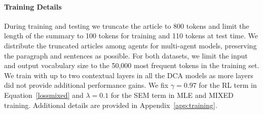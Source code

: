 \documentclass[11pt,a4paper]{article}
\begin{document}
\paragraph{Training Details}
During training and testing we truncate the
article to 800 tokens and limit the length of the
summary to 100 tokens for training and 110 tokens
at test time. We distribute the truncated articles among agents for multi-agent models, preserving the paragraph and sentences as possible. 
For both datasets, we limit the input and output vocabulary size to the 50,000 most frequent tokens in the training set. 
We train with up to two contextual layers in all the DCA models as more layers did not provide additional performance gains.
We fix $\gamma=0.97$ for the RL term in Equation~\eqref{lossmixed} and $\lambda=0.1$ for the SEM term in MLE and MIXED training. Additional details are provided in Appendix~\ref{app:training}.
\end{document}
